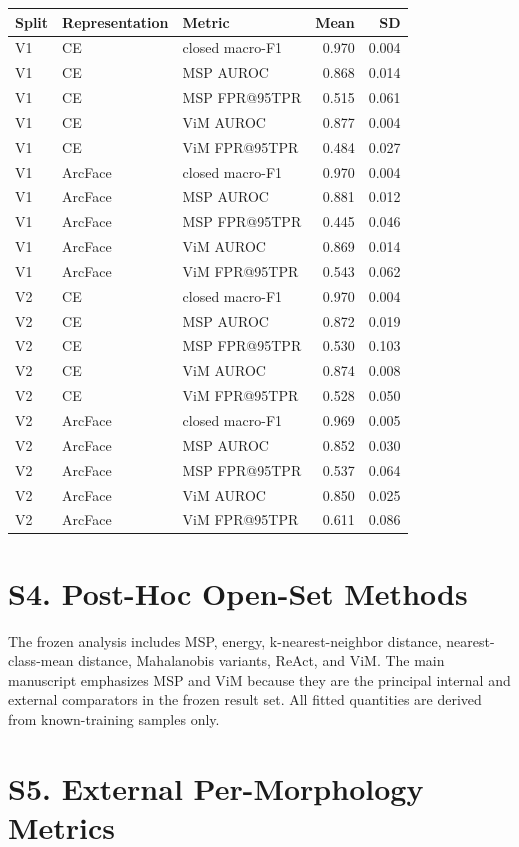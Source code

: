 \documentclass[11pt]{article}
\begin{document}
\begin{longtable}{l l l r r}
\toprule
Split & Representation & Metric & Mean & SD \\
\midrule
V1 & CE & closed macro-F1 & 0.970 & 0.004 \\
V1 & CE & MSP AUROC & 0.868 & 0.014 \\
V1 & CE & MSP FPR@95TPR & 0.515 & 0.061 \\
V1 & CE & ViM AUROC & 0.877 & 0.004 \\
V1 & CE & ViM FPR@95TPR & 0.484 & 0.027 \\
V1 & ArcFace & closed macro-F1 & 0.970 & 0.004 \\
V1 & ArcFace & MSP AUROC & 0.881 & 0.012 \\
V1 & ArcFace & MSP FPR@95TPR & 0.445 & 0.046 \\
V1 & ArcFace & ViM AUROC & 0.869 & 0.014 \\
V1 & ArcFace & ViM FPR@95TPR & 0.543 & 0.062 \\
V2 & CE & closed macro-F1 & 0.970 & 0.004 \\
V2 & CE & MSP AUROC & 0.872 & 0.019 \\
V2 & CE & MSP FPR@95TPR & 0.530 & 0.103 \\
V2 & CE & ViM AUROC & 0.874 & 0.008 \\
V2 & CE & ViM FPR@95TPR & 0.528 & 0.050 \\
V2 & ArcFace & closed macro-F1 & 0.969 & 0.005 \\
V2 & ArcFace & MSP AUROC & 0.852 & 0.030 \\
V2 & ArcFace & MSP FPR@95TPR & 0.537 & 0.064 \\
V2 & ArcFace & ViM AUROC & 0.850 & 0.025 \\
V2 & ArcFace & ViM FPR@95TPR & 0.611 & 0.086 \\
\bottomrule
\end{longtable}

\section*{S4. Post-Hoc Open-Set Methods}

The frozen analysis includes MSP, energy, k-nearest-neighbor distance, nearest-class-mean distance, Mahalanobis variants, ReAct, and ViM. The main manuscript emphasizes MSP and ViM because they are the principal internal and external comparators in the frozen result set. All fitted quantities are derived from known-training samples only.

\section*{S5. External Per-Morphology Metrics}
\end{document}
